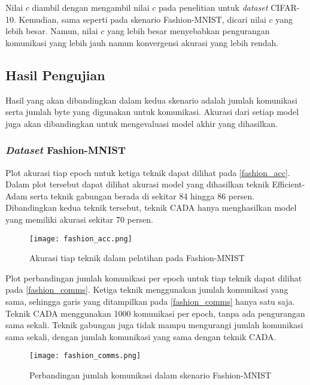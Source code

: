 Nilai $c$ diambil dengan mengambil nilai $c$ pada penelitian \textcite{Chen2021CADA} untuk \emph{dataset} CIFAR-10. Kemudian, sama seperti pada skenario Fashion-MNIST, dicari nilai $c$ yang lebih besar. Namun, nilai $c$ yang lebih besar menyebabkan pengurangan komunikasi yang lebih jauh namun konvergensi akurasi yang lebih rendah.

\subsection{Hasil Pengujian}

Hasil yang akan dibandingkan dalam kedua skenario adalah jumlah komunikasi serta jumlah byte yang digunakan untuk komunikasi. Akurasi dari setiap model juga akan dibandingkan untuk mengevaluasi model akhir yang dihasilkan.

\subsubsection{\emph{Dataset} Fashion-MNIST}

Plot akurasi tiap epoch untuk ketiga teknik dapat dilihat pada \autoref{fashion_acc}. Dalam plot tersebut dapat dilihat akurasi model yang dihasilkan teknik Efficient-Adam serta teknik gabungan berada di sekitar 84 hingga 86 persen. Dibandingkan kedua teknik tersebut, teknik CADA hanya menghasilkan model yang memiliki akurasi sekitar 70 persen.

\begin{figure}[H]
  \centering
  \texttt{[image: fashion\_acc.png]}
  \caption{Akurasi tiap teknik dalam pelatihan pada Fashion-MNIST}\label{fashion_acc}
\end{figure}

Plot perbandingan jumlah komunikasi per epoch untuk tiap teknik dapat dilihat pada \autoref{fashion_comms}. Ketiga teknik menggunakan jumlah komunikasi yang sama, sehingga garis yang ditampilkan pada \autoref{fashion_comms} hanya satu saja. Teknik CADA menggunakan 1000 komunikasi per epoch, tanpa ada pengurangan sama sekali. Teknik gabungan juga tidak mampu mengurangi jumlah komunikasi sama sekali, dengan jumlah komunikasi yang sama dengan teknik CADA.

\begin{figure}[H]
  \centering
  \texttt{[image: fashion\_comms.png]}
  \caption{Perbandingan jumlah komunikasi dalam skenario Fashion-MNIST}\label{fashion_comms}
\end{figure}

